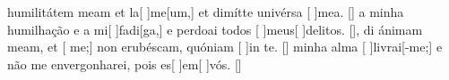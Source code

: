 {  %
  { humilitátem meam et la[ ]{me}[um,] et dimítte univérsa [ ]{me}a. [\LinkLA]}%
    { a minha humilhação e a mi[ ]{fa}{di}[ga,] e perdoai todos [ ]{meus}[ ]{de}{li}tos. [\LinkPT]},
  {di ánimam meam, et [ me;] non erubéscam, quóniam [ ]{in} te. [\LinkLA]}%
    { minha alma [ ]{li}{vrai}[-me;] e não me envergonharei, pois es[ ]{em}[ ]{vós}. [\LinkPT]}
}